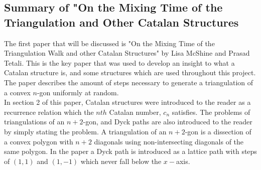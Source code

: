 \documentclass[12pt]{article}
\begin{document}
\subsection{Summary of "On the Mixing Time of the Triangulation and Other Catalan Structures}
The first paper that will be discussed is "On the Mixing Time of the Triangulation Walk and other Catalan Structures" by Lisa McShine and Prasad Tetali.\cite{McShine_onThe} This is the key paper that was used to develop an insight to what a Catalan structure is, and some structures which are used throughout this project. The paper describes the amount of steps necessary to generate a triangulation of a convex $n$-gon uniformly at random.\\
In section 2 of this paper, Catalan structures were introduced to the reader as a recurrence relation which the $nth$ Catalan number, $c_n$ satisfies. The problems of triangulations of an $n+2$-gon, and Dyck paths are also introduced to the reader by simply stating the problem. A triangulation of an $n+2$-gon is a dissection of a convex polygon with $n+2$ diagonals using non-intersecting diagonals of the same polygon. In the paper a Dyck path is introduced as a lattice path with steps of $(1,1)$ and $(1,-1)$ which never fall below the $x-$axis. 
\end{document}
